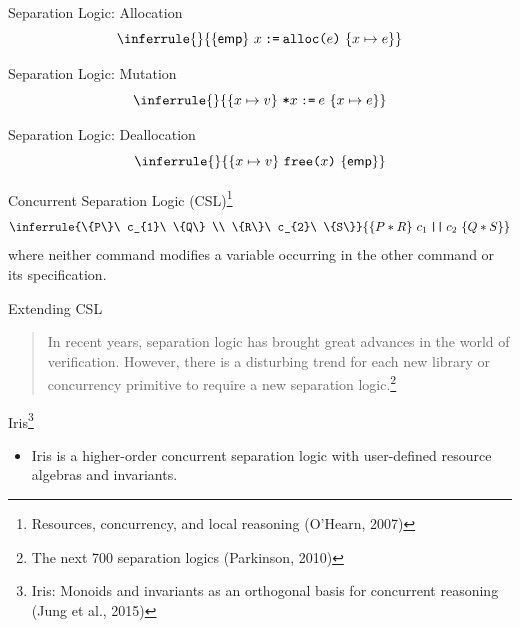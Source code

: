 \documentclass{beamer}
\begin{document}
\begin{frame}{Separation Logic: Allocation}
  \[
    \inferrule{ }{\{\mathsf{emp}\}\
      x\mathbin{\texttt{:=}}\texttt{alloc(}e\texttt{)}\ \{x\mapsto e\}}
  \]
\end{frame}

\begin{frame}{Separation Logic: Mutation}
  \[
    \inferrule{ }{\{x\mapsto v\}\
      \texttt{*}x\mathbin{\texttt{:=}}e\ \{x\mapsto e\}}
  \]
\end{frame}

\begin{frame}{Separation Logic: Deallocation}
  \[
    \inferrule{ }{\{x\mapsto v\}\
      \texttt{free(}x\texttt{)}\ \{\mathsf{emp}\}}
  \]
\end{frame}

\begin{frame}{Concurrent Separation Logic (CSL)\footnote{Resources, concurrency, and local reasoning (O'Hearn, 2007)}}
  \[
    \inferrule{\{P\}\ c_{1}\ \{Q\} \\
               \{R\}\ c_{2}\ \{S\}}
              {\{P*R\}\ c_{1}\mathbin{\texttt{||}}c_{2}\ \{Q*S\}}
  \]
  where neither command modifies a variable occurring in the other command or
  its specification.
\end{frame}

\begin{frame}{Extending CSL}
  \begin{quote}
    In recent years, separation logic has brought great advances in the world of
    verification. However, there is a disturbing trend for each new library or
    concurrency primitive to require a new separation logic.\footnote{The next
    700 separation logics (Parkinson, 2010)}
  \end{quote}
\end{frame}

\begin{frame}{Iris\footnote{Iris: Monoids and invariants as
      an orthogonal basis for concurrent reasoning (Jung et al., 2015)}}
  \begin{itemize}
    \item Iris is a higher-order concurrent separation logic with user-defined
      resource algebras and invariants.
  \end{itemize}
\end{frame}
\end{document}

